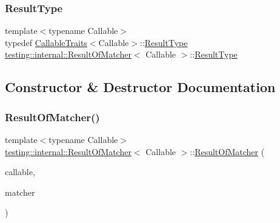 \subsubsection{\texorpdfstring{Result\+Type}{ResultType}}
{\footnotesize\ttfamily template$<$typename Callable$>$ \\
typedef \hyperlink{structtesting_1_1internal_1_1_callable_traits}{Callable\+Traits}$<$Callable$>$\+::\hyperlink{classtesting_1_1internal_1_1_result_of_matcher_aa9db2267792fcae2cfa3f57683f4e048}{Result\+Type} \hyperlink{classtesting_1_1internal_1_1_result_of_matcher}{testing\+::internal\+::\+Result\+Of\+Matcher}$<$ Callable $>$\+::\hyperlink{classtesting_1_1internal_1_1_result_of_matcher_aa9db2267792fcae2cfa3f57683f4e048}{Result\+Type}}



\subsection{Constructor \& Destructor Documentation}
\mbox{\label{classtesting_1_1internal_1_1_result_of_matcher_a77c27bcc81ff133c1117a7edf84df0b9}} 
\subsubsection{\texorpdfstring{Result\+Of\+Matcher()}{ResultOfMatcher()}}
{\footnotesize\ttfamily template$<$typename Callable$>$ \\
\hyperlink{classtesting_1_1internal_1_1_result_of_matcher}{testing\+::internal\+::\+Result\+Of\+Matcher}$<$ Callable $>$\+::\hyperlink{classtesting_1_1internal_1_1_result_of_matcher}{Result\+Of\+Matcher} (\begin{DoxyParamCaption}\item[{Callable}]{callable,  }\item[{const \hyperlink{classtesting_1_1_matcher}{Matcher}$<$ \hyperlink{classtesting_1_1internal_1_1_result_of_matcher_aa9db2267792fcae2cfa3f57683f4e048}{Result\+Type} $>$ \&}]{matcher }\end{DoxyParamCaption})\hspace{0.3cm}{\ttfamily [inline]}}



